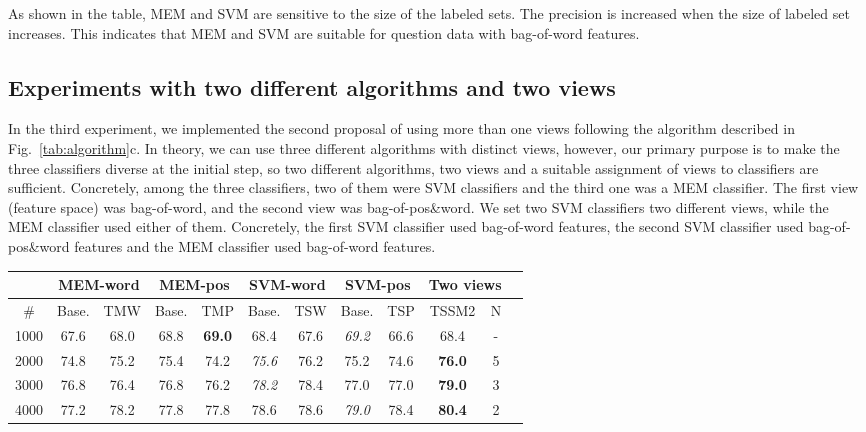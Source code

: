 \documentclass[english]{jnlp_1.4}
\begin{document}
As shown in the table, MEM and SVM are sensitive to the size of
the labeled sets. The precision is increased when the size of
labeled set increases. This indicates that MEM and SVM are
suitable for question data with bag-of-word features.
\subsection{Experiments with two different algorithms and two views}
In the third experiment, we implemented the second proposal of
using more than one views following the algorithm described in
Fig.~\ref{tab:algorithm}c. In theory, we can use three different
algorithms with distinct views, however, our primary purpose is to
make the three classifiers diverse at the initial step, so two
different algorithms, two views and a suitable assignment of views
to classifiers are sufficient. Concretely, among the three
classifiers, two of them were SVM classifiers and the third one
was a MEM classifier. The first view (feature space) was
bag-of-word, and the second view was bag-of-pos\&word. We set two
SVM classifiers two different views, while the MEM classifier used
either of them. Concretely, the first SVM classifier used
bag-of-word features, the second SVM classifier used
bag-of-pos\&word features and the MEM classifier used bag-of-word
features.

\begin{table}[b]
\label{twoviews}
\centering 
\begin{tabular}{|c||c|c||c|c||c|c||c|c||c|c|c||}
  \hline
   &
  \multicolumn{2}{|c|}{MEM-word} &
  \multicolumn{2}{|c|}{MEM-pos} &
  \multicolumn{2}{|c|}{SVM-word} &
  \multicolumn{2}{|c|}{SVM-pos}
  & \multicolumn{2}{|c|}{Two views} \\
  \hline
  \# &  Base. & TMW &  Base. & TMP &  Base. & TSW &  Base. & TSP &   TSSM2 & N \\
  \hline
  1000 & 67.6 & 68.0 & 68.8 & \textbf{69.0} & 68.4 & 67.6 &  \textit{69.2}  & 66.6 &  68.4 & - \\
  2000 & 74.8 & 75.2 & 75.4 & 74.2 & \textit{75.6} & 76.2 & 75.2  & 74.6 &  \textbf{76.0} & 5 \\
  3000 & 76.8 & 76.4 & 76.8 & 76.2 & \textit{78.2} & 78.4 & 77.0  & 77.0 &  \textbf{79.0} & 3 \\
  4000 & 77.2 & 78.2 & 77.8 & 77.8 & 78.6 & 78.6 & \textit{79.0}  & 78.4 &  \textbf{80.4} & 2 \\
  \hline

\end{tabular}
\end{table}
\end{document}
